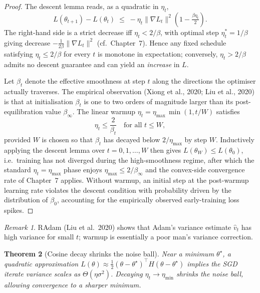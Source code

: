 \documentclass[11pt]{article}
\newtheorem{theorem}{Theorem}[section]
\theoremstyle{remark}
\newtheorem{remark}[theorem]{Remark}
\begin{document}
\begin{proof}
The descent lemma reads, as a quadratic in $\eta_t$,
\[
  L(\theta_{t+1}) - L(\theta_t) \;\le\; -\eta_t\|\nabla L_t\|^2 \left(1 - \tfrac{\beta \eta_t}{2}\right).
\]
The right-hand side is a strict decrease iff $\eta_t < 2/\beta$, with optimal step $\eta_t^* = 1/\beta$ giving decrease $-\tfrac{1}{2\beta}\|\nabla L_t\|^2$ (cf.\ Chapter~7). Hence any fixed schedule satisfying $\eta_t \le 2/\beta$ for every $t$ is monotone in expectation; conversely, $\eta_t > 2/\beta$ admits no descent guarantee and can yield an \emph{increase} in $L$.

Let $\beta_t$ denote the effective smoothness at step $t$ along the directions the optimiser actually traverses. The empirical observation (Xiong et al., 2020; Liu et al., 2020) is that at initialisation $\beta_t$ is one to two orders of magnitude larger than its post-equilibration value $\beta_\infty$. The linear warmup $\eta_t = \eta_{\max}\,\min(1, t / W)$ satisfies
\[
  \eta_t \le \frac{2}{\beta_t} \quad\text{for all } t \le W,
\]
provided $W$ is chosen so that $\beta_t$ has decayed below $2/\eta_{\max}$ by step $W$. Inductively applying the descent lemma over $t = 0, 1, \ldots, W$ then gives $L(\theta_{W}) \le L(\theta_0)$, i.e.\ training has not diverged during the high-smoothness regime, after which the standard $\eta_t = \eta_{\max}$ phase enjoys $\eta_{\max} \le 2/\beta_\infty$ and the convex-side convergence rate of Chapter~7 applies. Without warmup, an initial step at the post-warmup learning rate violates the descent condition with probability driven by the distribution of $\beta_0$, accounting for the empirically observed early-training loss spikes.
\end{proof}

\begin{remark}
RAdam (Liu et al.\ 2020) shows that Adam's variance estimate $\hat v_t$ has high variance for small $t$; warmup is essentially a poor man's variance correction.
\end{remark}

\begin{theorem}[Cosine decay shrinks the noise ball]
Near a minimum $\theta^\star$, a quadratic approximation $L(\theta)\approx\tfrac{1}{2}(\theta-\theta^\star)^\top H(\theta-\theta^\star)$ implies the SGD iterate variance scales as $\Theta(\eta\sigma^2)$. Decaying $\eta_t\to\eta_{\min}$ shrinks the noise ball, allowing convergence to a sharper minimum.
\end{theorem}
\end{document}
